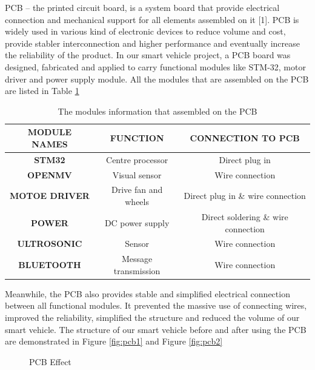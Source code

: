 \documentclass[12pt, a4paper, oneside]{report}
\begin{document}
PCB – the printed circuit board, is a system board that provide electrical connection and mechanical support for all elements assembled on it [1]. PCB is widely used in various kind of electronic devices to reduce volume and cost, provide stabler interconnection and higher performance and eventually increase the reliability of the product. In our smart vehicle project, a PCB board was designed, fabricated and applied to carry functional modules like STM-32, motor driver and power supply module. All the modules that are assembled on the PCB are listed in Table \ref{table:pcb1}
	\begin{table}[!h]
	\centering
		\begin{tabular}{|c|c|c|}
		\hline
 \textbf{MODULE NAMES} &\textbf{FUNCTION} &\textbf{CONNECTION TO PCB} \\
  \hline
 \textbf{STM32} &Centre processor &Direct plug in  \\
 \hline
 \textbf{OPENMV} &Visual sensor  &Wire connection \\
 \hline
 \textbf{MOTOE DRIVER} & Drive fan and wheels & Direct plug in \& wire connection \\
 \hline
\textbf{POWER} & DC power supply & Direct soldering \& wire connection\\
\hline
\textbf{ULTROSONIC} & Sensor  & Wire connection\\
\hline
\textbf{BLUETOOTH} & Message transmission & Wire connection\\
\hline
\end{tabular}
\caption{The modules information that assembled on the PCB}
\label{table:pcb1}
	\end{table}
	
\noindent
Meanwhile, the PCB also provides stable and simplified electrical connection between all functional modules. It prevented the massive use of connecting wires, improved the reliability, simplified the structure and reduced the volume of our smart vehicle. The structure of our smart vehicle before and after using the PCB are demonstrated in Figure \ref{fig:pcb1} and Figure \ref{fig:pcb2}

\begin{figure}[H]
  \centering
  \hspace{0.5cm}
  \caption{PCB Effect}
  \label{fig:pcbA}
\end{figure} 
\end{document}
